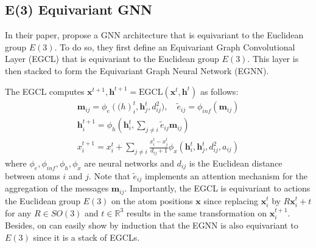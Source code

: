 \documentclass[sigconf]{acmart}
\begin{document}
\subsection{E(3) Equivariant GNN}
In their paper, \cite{edm} propose a GNN architecture that is equivariant to the Euclidean group $E(3)$. To do so, they first define an Equivariant 
Graph Convolutional Layer (EGCL) that is equivariant to the Euclidean group $E(3)$. This layer is then stacked to form the Equivariant Graph Neural Network (EGNN).

The EGCL computes $\mathbf{x}^{t+1}, \mathbf{h}^{t+1} = \text{EGCL}(\mathbf{x}^t, \mathbf{h}^t)$ as follows:
\begin{gather}
    \mathbf{m}_{ij} = \phi_e(\mathbf(h)_i^t, \mathbf{h}_j^t, d_{ij}^2), \quad \tilde{e}_{ij} = \phi_{inf}(\mathbf{m}_{ij}) \\
    \mathbf{h}_i^{t+1} = \phi_h(\mathbf{h}_i^t, \sum_{j\neq i} \tilde{e}_{ij} \mathbf{m}_{ij}) \\
    x_i^{t+1} = x_i^t + \sum_{j\neq i} \frac{x_i^t - x_j^t}{d_{ij}+1} \phi_x(\mathbf{h}_i^t, \mathbf{h}_j^t, d_{ij}^2, a_{ij})
\end{gather}
where $\phi_e, \phi_{inf}, \phi_h, \phi_x$ are neural networks and $d_{ij}$ is the Euclidean distance between atoms $i$ and $j$.
Note that $\tilde{e}_{ij}$ implements an attention mechanism for the aggregation of the messages $\mathbf{m}_{ij}$.
Importantly, the EGCL is equivariant to actions the Euclidean group $E(3)$ on the atom positions $\mathbf{x}$ since replacing $\mathbf{x}_i^t$ by $R\mathbf{x}_i^t + t$ for any $R\in SO(3)$ and $t\in \mathbb{R}^3$ results in the same transformation on $\mathbf{x}_i^{t+1}$.
Besides, on can easily show by induction that the EGNN is also equivariant to $E(3)$ since it is a stack of EGCLs.
\end{document}

